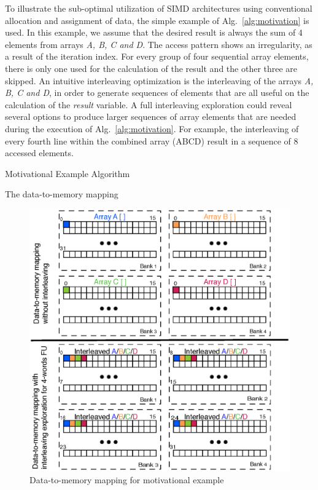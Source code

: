 \documentclass[prodmode,acmtodaes]{acmsmall}
\begin{document}
To illustrate the sub-optimal utilization of SIMD architectures using conventional allocation and assignment of data, the simple example of Alg.~\ref{alg:motivation} is used.
In this example, we assume that the desired result is always the sum of 4 elements from arrays \textit{A, B, C and D}. 
The access pattern shows an irregularity, as a result of the iteration index.
For every group of four sequential array elements, there is only one used for the calculation of the result and the other three are skipped.
An intuitive interleaving optimization is the interleaving of the arrays \textit{A, B, C and D}, in order to generate sequences of elements that are all useful on the calculation of the \textit{result} variable. 
A full interleaving exploration could reveal several options to produce larger sequences of array elements that are needed during the execution of Alg.~\ref{alg:motivation}.
For example, the interleaving of every fourth line within the combined array (A\vert B\vert C\vert D) result in a sequence of 8 accessed elements.

\begin{algorithm}[t]
\SetAlgoNoLine
{}
\caption{Motivational Example Algorithm}
\label{alg:motivation}
\end{algorithm}

The data-to-memory mapping 

\begin{figure}
\centering
	\label{motivational}
	\caption{Data-to-memory mapping for motivational example}
	\includegraphics[scale = 0.5]{Images/motivation.eps}
\end{figure}
\end{document}
